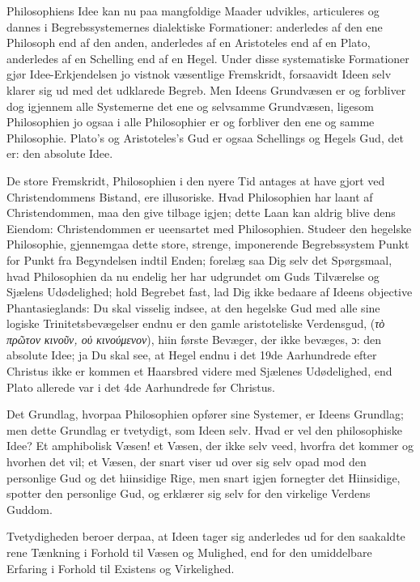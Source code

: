 \documentclass[12pt,a4paper]{book}
\newcommand{\opage}[1]{\marginnote{\footnotesize\textit{[#1]}}}
\begin{document}
Philosophiens Idee kan nu paa mangfoldige Maader udvikles, articuleres og
dannes i Begrebssystemernes dialektiske Formationer: anderledes af den
ene Philosoph end af den anden, anderledes af en Aristoteles end af en
Plato, anderledes af en Schelling end af en Hegel. Under disse
systematiske Formationer gjør Idee-Erkjendelsen jo vistnok væsentlige
Fremskridt, forsaavidt Ideen selv klarer sig ud med det udklarede Begreb.
Men Ideens Grundvæsen er og forbliver dog igjennem alle Systemerne det
ene og selvsamme Grundvæsen, ligesom Philosophien jo ogsaa i alle
Philosophier er og forbliver den ene og samme Philosophie. Plato's og
Aristoteles's Gud er ogsaa Schellings og Hegels Gud, det er: den absolute
Idee.

De store Fremskridt, Philosophien i den nyere Tid antages at have gjort
ved Christendommens Bistand, ere illusoriske. Hvad Philosophien har
laant af Christendommen, maa den give tilbage igjen; dette Laan kan
aldrig blive dens Eiendom: Christendommen er ueensartet med
Philosophien. Studeer den hegelske Philosophie, gjennemgaa dette store,
strenge, imponerende Begrebssystem Punkt for Punkt fra Begyndelsen indtil
Enden; forelæg saa Dig selv det Spørgsmaal, hvad Philosophien da nu
endelig her har udgrundet om Guds Tilværelse og Sjælens Udødelighed; hold
Begrebet fast, lad Dig ikke bedaare af Ideens objective
Phantasieglands: Du skal visselig indsee, at den hegelske Gud med alle
sine logiske Trinitetsbevægelser endnu er den gamle
\opage{88} %
aristoteliske Verdensgud, (\textit{τὸ πρῶτον κινοῦν, οὐ κινούμενον}),
hiin første Bevæger, der ikke bevæges, ɔ: den absolute Idee; ja Du skal
see, at Hegel endnu i det 19de Aarhundrede efter Christus ikke er kommen
et Haarsbred videre med Sjælenes Udødelighed, end Plato allerede var i
det 4de Aarhundrede før Christus.

Det Grundlag, hvorpaa Philosophien opfører sine Systemer, er Ideens
Grundlag; men dette Grundlag er tvetydigt, som Ideen selv. Hvad er vel
den philosophiske Idee? Et amphibolisk Væsen! et Væsen, der ikke selv
veed, hvorfra det kommer og hvorhen det vil; et Væsen, der snart viser ud
over sig selv opad mod den personlige Gud og det hiinsidige Rige, men
snart igjen fornegter det Hiinsidige, spotter den personlige Gud, og
erklærer sig selv for den virkelige Verdens Guddom.

Tvetydigheden beroer derpaa, at Ideen tager sig anderledes ud for den
saakaldte rene Tænkning i Forhold til Væsen og Mulighed, end for den
umiddelbare Erfaring i Forhold til Existens og Virkelighed.
\end{document}
